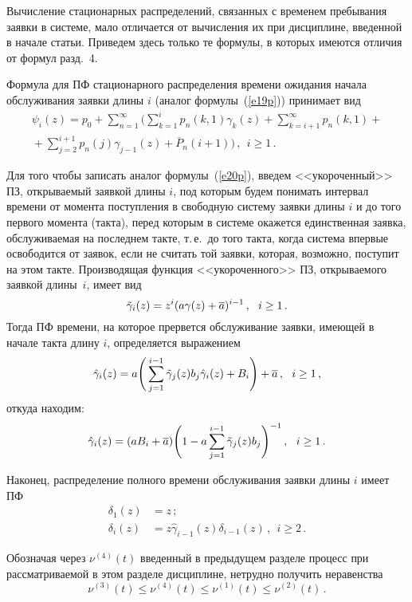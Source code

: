 \begin{multicols}{2}
Вычисление стационарных распределений, связанных с временем
пребывания заявки в системе, мало отличается от вычисления
их при дисциплине, введенной в начале статьи.
Приведем здесь только те формулы, в которых имеются
отличия от формул разд.~4.

Формула для ПФ стационарного распределения времени ожидания
начала обслуживания заявки длины $i$ (аналог формулы~(\ref{e19p}))
принимает вид
\begin{multline*}
\!\!\!\!\psi_i(z)    = p_0 + \sum_{n=1}^\infty
\Bigg(
\sum_{k=1}^{i} p_n(k,1) \gamma_{k}(z)
+  \sum_{k=i+1}^{\infty} p_n(k,1) +{}\\
{}+  \sum_{j=2}^{i+1}
p_n(j) \gamma_{j-1}(z)  + \overline P_n(i+1)
\Bigg)\,,
\ \ i\ge 1\,.
\end{multline*}

Для того чтобы записать аналог формулы~(\ref{e20p}),
введем <<укороченный>> ПЗ, открываемый заявкой длины $i$,
под которым будем понимать интервал времени от момента
поступления в свободную сис\-те\-му заявки длины $i$ и до того
первого момента (такта),
перед которым в системе окажется единственная заявка,
обслуживаемая на последнем такте,
т.\,е.\ до того такта, когда система впервые освободится от
заявок, если не считать той заявки, которая, возможно,
поступит на этом такте.
Производящая функция <<укороченного>> ПЗ, открываемого заявкой длины~$i$,
имеет вид
$$
\tilde\gamma_{i}(z) = z^i (a \gamma(z) + \overline a)^{i-1}\,,
\ \ i\ge 1\,.
$$
Тогда ПФ времени, на которое прервется обслуживание заявки,
имеющей в начале такта длину $i$, определяется
выражением
$$
\hat\gamma_{i}(z) = a \Bigg(
\sum_{j=1}^{i-1}      \tilde\gamma_{j}(z) b_j
\hat\gamma_{i}(z)     + B_i
\Bigg) + \overline a\,, \ \ i\ge 1\,,
$$
откуда находим:
$$
\hat\gamma_{i}(z) = (a B_i + \overline a)
\Bigg(
1 - a \sum_{j=1}^{i-1} \tilde\gamma_{j}(z) b_j
\Bigg)^{-1}\,, \ \ i\ge 1\,.
$$

Наконец, распределение полного времени обслуживания заявки
длины $i$ имеет ПФ
\begin{align*}
\delta_1(z)  & = z\,;\\
\delta_i(z) & = z \hat\gamma_{i-1}(z) \delta_{i-1}(z)\,, \ \ i\ge 2\,.
\end{align*}

Обозначая через $\nu^{(4)}(t)$ введенный в предыдущем
разделе процесс при рассматриваемой в этом разделе
дисциплине, нетрудно получить неравенства
$$
\nu^{(3)}(t) \le \nu^{(4)}(t) \le \nu^{(1)}(t)
\le \nu^{(2)}(t)\,.
$$


\end{multicols}
